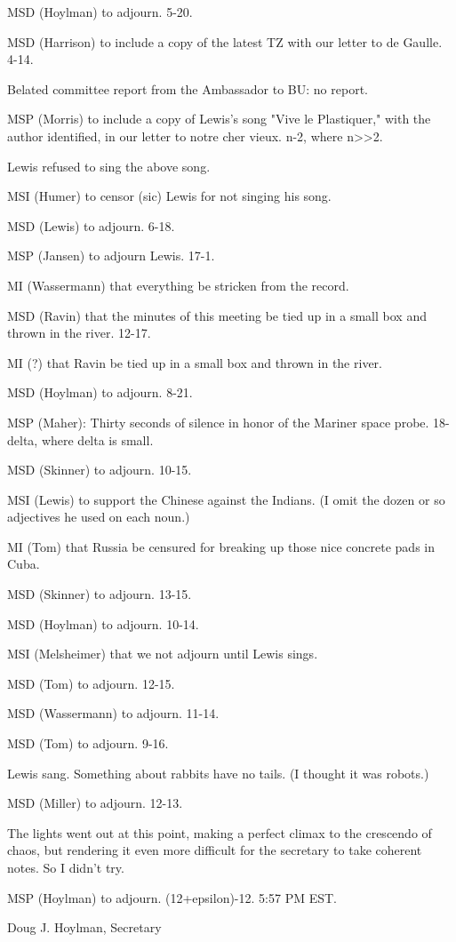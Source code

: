 \documentclass[12pt]{article}
\begin{document}
MSD (Hoylman) to adjourn. 5-20.

MSD (Harrison) to include a copy of the latest TZ with our letter to de Gaulle. 4-14.

Belated committee report from the Ambassador to BU: no report.

MSP (Morris) to include a copy of Lewis's song "Vive le Plastiquer," with the author identified, in our letter to notre cher vieux. n-2, where n>>2.

Lewis refused to sing the above song.

MSI (Humer) to censor (sic) Lewis for not singing his song.

MSD (Lewis) to adjourn. 6-18.

MSP (Jansen) to adjourn Lewis. 17-1.

MI (Wassermann) that everything be stricken from the record.

MSD (Ravin) that the minutes of this meeting be tied up in a small box and thrown in the river. 12-17.

MI (?) that Ravin be tied up in a small box and thrown in the river.

MSD (Hoylman) to adjourn. 8-21.

MSP (Maher): Thirty seconds of silence in honor of the Mariner space probe. 18-delta, where delta is small.

MSD (Skinner) to adjourn. 10-15.

MSI (Lewis) to support the Chinese against the Indians. (I omit the dozen or so adjectives he used on each noun.)

MI (Tom) that Russia be censured for breaking up those nice concrete pads in Cuba.

MSD (Skinner) to adjourn. 13-15.

MSD (Hoylman) to adjourn. 10-14.

MSI (Melsheimer) that we not adjourn until Lewis sings.

MSD (Tom) to adjourn. 12-15.

MSD (Wassermann) to adjourn. 11-14.

MSD (Tom) to adjourn. 9-16.

Lewis sang. Something about rabbits have no tails. (I thought it was robots.)

MSD (Miller) to adjourn. 12-13.

The lights went out at this point, making a perfect climax to the crescendo of chaos, but rendering it even more difficult for the secretary to take coherent notes. So I didn't try.

MSP (Hoylman) to adjourn. (12+epsilon)-12. 5:57 PM EST.

\vspace{12pt}

\centerline{Doug J. Hoylman, Secretary}
\end{document}
